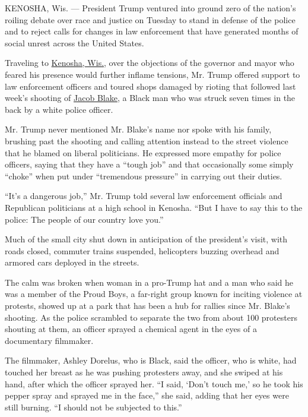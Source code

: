 KENOSHA, Wis. --- President Trump ventured into ground zero of the
nation's roiling debate over race and justice on Tuesday to stand in
defense of the police and to reject calls for changes in law enforcement
that have generated months of social unrest across the United States.

Traveling to
\href{https://www.nytimes3xbfgragh.onion/2020/09/02/us/politics/trump-kenosha-markey-kennedy.html}{Kenosha,
Wis.}, over the objections of the governor and mayor who feared his
presence would further inflame tensions, Mr. Trump offered support to
law enforcement officers and toured shops damaged by rioting that
followed last week's shooting of
\href{https://www.nytimes3xbfgragh.onion/2020/08/28/us/jacob-blake-shackles-assault.html}{Jacob
Blake}, a Black man who was struck seven times in the back by a white
police officer.

Mr. Trump never mentioned Mr. Blake's name nor spoke with his family,
brushing past the shooting and calling attention instead to the street
violence that he blamed on liberal politicians. He expressed more
empathy for police officers, saying that they have a ``tough job'' and
that occasionally some simply ``choke'' when put under ``tremendous
pressure'' in carrying out their duties.

``It's a dangerous job,'' Mr. Trump told several law enforcement
officials and Republican politicians at a high school in Kenosha. ``But
I have to say this to the police: The people of our country love you.''

Much of the small city shut down in anticipation of the president's
visit, with roads closed, commuter trains suspended, helicopters buzzing
overhead and armored cars deployed in the streets.

The calm was broken when woman in a pro-Trump hat and a man who said he
was a member of the Proud Boys, a far-right group known for inciting
violence at protests, showed up at a park that has been a hub for
rallies since Mr. Blake's shooting. As the police scrambled to separate
the two from about 100 protesters shouting at them, an officer sprayed a
chemical agent in the eyes of a documentary filmmaker.

The filmmaker, Ashley Dorelus, who is Black, said the officer, who is
white, had touched her breast as he was pushing protesters away, and she
swiped at his hand, after which the officer sprayed her. ``I said,
`Don't touch me,' so he took his pepper spray and sprayed me in the
face,'' she said, adding that her eyes were still burning. ``I should
not be subjected to this.''

